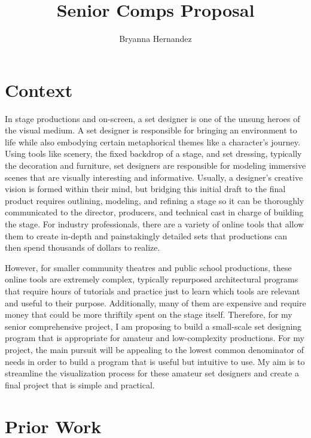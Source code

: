 \documentclass[10pt,twocolumn]{article}
\title{Senior Comps Proposal}
\author{Bryanna Hernandez}
\affiliation{Occidental College}
\begin{document}
\maketitle

\section{Context}
In stage productions and on-screen, a set designer is one of the unsung heroes of the visual medium. A set designer is responsible for bringing an environment to life while also embodying certain metaphorical themes like a character's journey. Using tools like scenery, the fixed backdrop of a stage, and set dressing, typically the decoration and furniture, set designers are responsible for modeling immersive scenes that are visually interesting and informative. Usually, a designer's creative vision is formed within their mind, but bridging this initial draft to the final product requires outlining, modeling, and refining a stage so it can be thoroughly communicated to the director, producers, and technical cast in charge of building the stage. For industry professionals, there are a variety of online tools that allow them to create in-depth and painstakingly detailed sets that productions can then spend thousands of dollars to realize. 

However, for smaller community theatres and public school productions, these online tools are extremely complex, typically repurposed architectural programs that require hours of tutorials and practice just to learn which tools are relevant and useful to their purpose. Additionally, many of them are expensive and require money that could be more thriftily spent on the stage itself. Therefore, for my senior comprehensive project, I am proposing to build a small-scale set designing program that is appropriate for amateur and low-complexity productions. For my project, the main pursuit will be appealing to the lowest common denominator of needs in order to build a program that is useful but intuitive to use. My aim is to streamline the visualization process for these amateur set designers and create a final project that is simple and practical.

\section{Prior Work}
\end{document}

